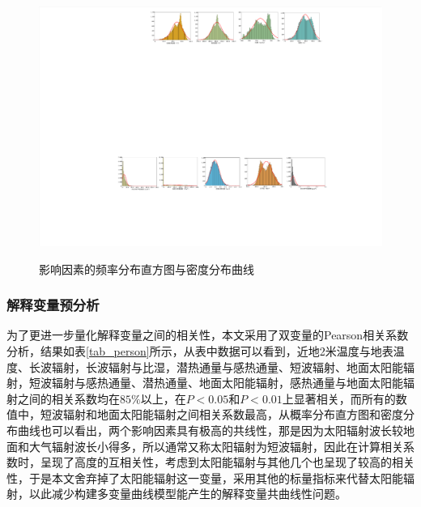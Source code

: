 \documentclass[a4paper,10pt]{my_paper}
\numberwithin{equation}{section}
\begin{document}
\begin{figure}[!htbp]
{    \includegraphics[width=.9\textwidth]{Sig_Histogram_5.pdf}
    }
    \caption{影响因素的频率分布直方图与密度分布曲线}\label{fig_Histogram}
\end{figure}

\subsubsection{解释变量预分析}
为了更进一步量化解释变量之间的相关性，本文采用了双变量的Pearson相关系数分析，结果如表\ref{tab_person}所示，从表中数据可以看到，近地2米温度与地表温度、长波辐射，长波辐射与比湿，潜热通量与感热通量、短波辐射、地面太阳能辐射，短波辐射与感热通量、潜热通量、地面太阳能辐射，感热通量与地面太阳能辐射之间的相关系数均在${85\%}$以上，在${P<0.05}$和${P<0.01}$上显著相关，而所有的数值中，短波辐射和地面太阳能辐射之间相关系数最高，从概率分布直方图和密度分布曲线也可以看出，两个影响因素具有极高的共线性，那是因为太阳辐射波长较地面和大气辐射波长小得多，所以通常又称太阳辐射为短波辐射，因此在计算相关系数时，呈现了高度的互相关性，考虑到太阳能辐射与其他几个也呈现了较高的相关性，于是本文舍弃掉了太阳能辐射这一变量，采用其他的标量指标来代替太阳能辐射，以此减少构建多变量曲线模型能产生的解释变量共曲线性问题。
\end{document}
